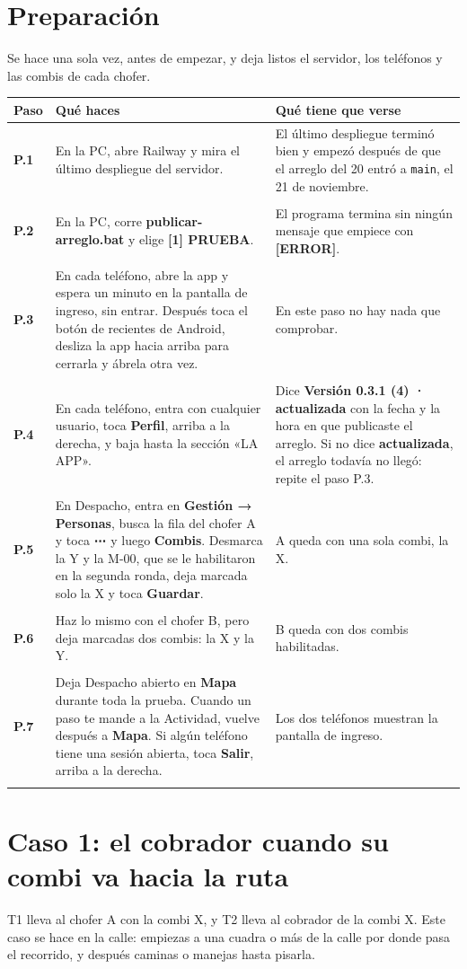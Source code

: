 \documentclass[10pt,a4paper]{article}
\makeatletter
\newcommand{\toca}[1]{\textcolor{azul}{\textbf{#1}}}
\newcommand{\pantalla}[1]{\textcolor{marron}{\textbf{#1}}}
\newcommand{\nada}{\textcolor{tenue}{En este paso no hay nada que comprobar.}}
\newcommand{\caja}[2]{\hbox{\vrule height #1 depth 0pt width 0pt #2}}
\newcommand{\campo}[3]{%
  \raisebox{-0.35\height}{\caja{#3}{\TextField[name=#1, width=#2, height=#3, charsize=8pt, bordercolor={0.55 0.6 0.68},
    backgroundcolor={0.965 0.976 0.992}, multiline=true]{}}}}
\newcommand{\resultado}[1]{%
  \caja{9pt}{\ChoiceMenu[radio, name=resultado-#1, width=9pt, height=9pt, radiosymbol=l,
    bordercolor={0.35 0.38 0.45}, default=]{}{OK=ok,FALLA=falla,NO SE PUDO=nopudo}}}
\newcommand{\paso}[4]{%
  \textbf{#1} & #3 & #4 \\*
  \multicolumn{3}{@{\hspace{6pt}}l@{}}{\rule{0pt}{15pt}\small
    \resultado{#2}\hspace{0.4em}Hora:~\campo{hora-#2}{1.7cm}{13pt}\hspace{1.2em}Nota:~\campo{nota-#2}{8.3cm}{22pt}}\\[3pt]
  \hline
}
\newenvironment{pasos}{%
  \begin{longtable}{@{\hspace{6pt}}>{\raggedright\arraybackslash}p{0.9cm}>{\raggedright\arraybackslash}p{7.9cm}>{\raggedright\arraybackslash}p{7.3cm}@{}}
  \rowcolor{cabecera}\textbf{Paso} & \textbf{Qué haces} & \textbf{Qué tiene que verse} \\ \hline
  \endhead
}{\end{longtable}\vspace{-0.6em}}
\makeatother
\begin{document}
\begin{Form}
\section{Preparación}

Se hace una sola vez, antes de empezar, y deja listos el servidor, los teléfonos y las combis de cada chofer.

\begin{pasos}
\paso{P.1}{P-1}{En la PC, abre Railway y mira el último despliegue del servidor.}{El último despliegue terminó bien y empezó después de que el arreglo del 20 entró a \texttt{main}, el 21 de noviembre.}
\paso{P.2}{P-2}{En la PC, corre \toca{publicar-arreglo.bat} y elige \toca{[1] PRUEBA}.}{El programa termina sin ningún mensaje que empiece con \pantalla{[ERROR]}.}
\paso{P.3}{P-3}{En cada teléfono, abre la app y espera un minuto en la pantalla de ingreso, sin entrar. Después toca el botón de recientes de Android, desliza la app hacia arriba para cerrarla y ábrela otra vez.}{\nada}
\paso{P.4}{P-4}{En cada teléfono, entra con cualquier usuario, toca \toca{Perfil}, arriba a la derecha, y baja hasta la sección «LA APP».}{Dice \pantalla{Versión 0.3.1 (4) · actualizada} con la fecha y la hora en que publicaste el arreglo. Si no dice \pantalla{actualizada}, el arreglo todavía no llegó: repite el paso P.3.}
\paso{P.5}{P-5}{En Despacho, entra en \toca{Gestión → Personas}, busca la fila del chofer A y toca \toca{⋯} y luego \toca{Combis}. Desmarca la Y y la M-00, que se le habilitaron en la segunda ronda, deja marcada solo la X y toca \toca{Guardar}.}{A queda con una sola combi, la X.}
\paso{P.6}{P-6}{Haz lo mismo con el chofer B, pero deja marcadas dos combis: la X y la Y.}{B queda con dos combis habilitadas.}
\paso{P.7}{P-7}{Deja Despacho abierto en \toca{Mapa} durante toda la prueba. Cuando un paso te mande a la Actividad, vuelve después a \toca{Mapa}. Si algún teléfono tiene una sesión abierta, toca \toca{Salir}, arriba a la derecha.}{Los dos teléfonos muestran la pantalla de ingreso.}
\end{pasos}

\section{Caso 1: el cobrador cuando su combi va hacia la ruta}

T1 lleva al chofer A con la combi X, y T2 lleva al cobrador de la combi X. Este caso se hace en la calle: empiezas a una cuadra o más de la calle por donde pasa el recorrido, y después caminas o manejas hasta pisarla.


\end{Form}
\end{document}
